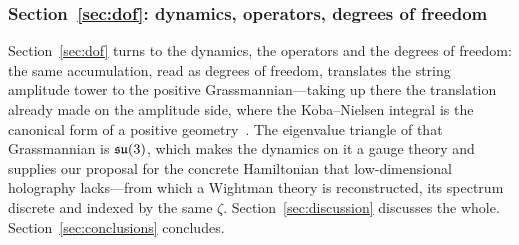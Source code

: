 \subsubsection{Section~\ref{sec:dof}: dynamics, operators, degrees of freedom}
Section~\ref{sec:dof} turns to the dynamics, the operators and the degrees of freedom: the
same accumulation, read as degrees of freedom, translates the string amplitude tower to the
positive Grassmannian---taking up there the translation already made on the amplitude side,
where the Koba--Nielsen integral is the canonical form of a positive
geometry~\cite{ABHY18,AHL19}. The eigenvalue triangle of that Grassmannian is $\mathfrak{su}(3)$,
which makes the dynamics on it a gauge theory and supplies our proposal for the concrete
Hamiltonian that low-dimensional holography lacks---from which a Wightman theory is
reconstructed, its spectrum discrete and indexed by the same $\zeta$.
Section~\ref{sec:discussion} discusses the whole. Section~\ref{sec:conclusions} concludes.
